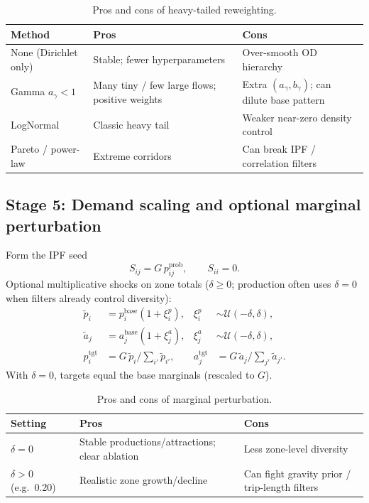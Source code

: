 \documentclass[11pt,a4paper]{report}
\begin{document}
\begin{table}[ht]
\centering
\caption{Pros and cons of heavy-tailed reweighting.}
\label{tab:pros_gamma}
\small
\begin{tabular}{@{}p{3.0cm}p{5.2cm}p{5.2cm}@{}}
\toprule
\textbf{Method} & \textbf{Pros} & \textbf{Cons} \\
\midrule
None (Dirichlet only) &
Stable; fewer hyperparameters &
Over-smooth OD hierarchy \\
Gamma $a_{\gamma}<1$ &
Many tiny / few large flows; positive weights &
Extra $(a_{\gamma},b_{\gamma})$; can dilute base pattern \\
LogNormal &
Classic heavy tail &
Weaker near-zero density control \\
Pareto / power-law &
Extreme corridors &
Can break IPF / correlation filters \\
\bottomrule
\end{tabular}
\end{table}

\subsection{Stage 5: Demand scaling and optional marginal perturbation}

Form the IPF seed
\begin{equation}
    S_{ij} = G\, p_{ij}^{\mathrm{prob}}, \qquad S_{ii}=0.
\end{equation}
Optional multiplicative shocks on zone totals ($\delta\ge 0$; production often uses $\delta=0$ when filters already control diversity):
\begin{align}
    \tilde{p}_i &= p_i^{\mathrm{base}}(1+\xi_i^p), &
    \xi_i^p &\sim \mathcal{U}(-\delta,\delta), \\
    \tilde{a}_j &= a_j^{\mathrm{base}}(1+\xi_j^a), &
    \xi_j^a &\sim \mathcal{U}(-\delta,\delta), \\
    p_i^{\mathrm{tgt}} &= G\,\tilde{p}_i\Big/\textstyle\sum_{i'}\tilde{p}_{i'}, &
    a_j^{\mathrm{tgt}} &= G\,\tilde{a}_j\Big/\textstyle\sum_{j'}\tilde{a}_{j'}.
\end{align}
With $\delta=0$, targets equal the base marginals (rescaled to $G$).

\begin{table}[ht]
\centering
\caption{Pros and cons of marginal perturbation.}
\label{tab:pros_delta}
\small
\begin{tabular}{@{}p{3.2cm}p{5.1cm}p{5.1cm}@{}}
\toprule
\textbf{Setting} & \textbf{Pros} & \textbf{Cons} \\
\midrule
$\delta=0$ &
Stable productions/attractions; clear ablation &
Less zone-level diversity \\
$\delta>0$ (e.g.\ 0.20) &
Realistic zone growth/decline &
Can fight gravity prior / trip-length filters \\
\bottomrule
\end{tabular}
\end{table}
\end{document}
